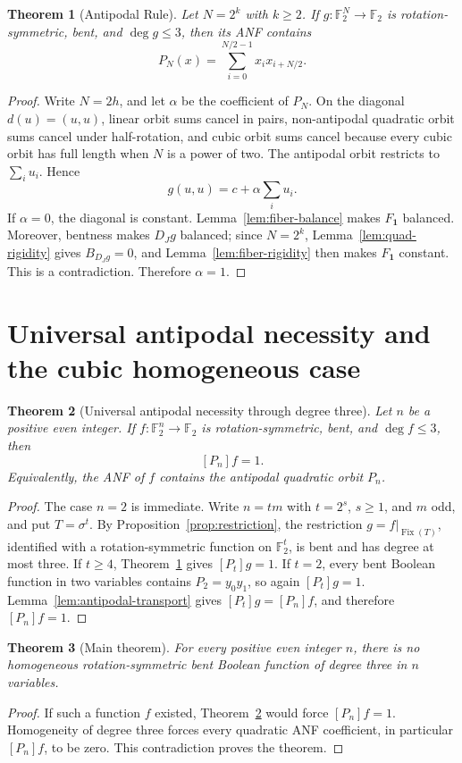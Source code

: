 \documentclass[11pt,a4paper]{article}
\newtheorem{theorem}{Theorem}[section]
\newcommand{\F}{\mathbb F_2}
\newcommand{\Fix}{\operatorname{Fix}}
\begin{document}
\begin{theorem}[Antipodal Rule]\label{thm:antipodal}
Let \(N=2^k\) with \(k\ge2\). If \(g:\F^N\to\F\) is rotation-symmetric, bent, and \(\deg g\le3\), then its ANF contains
\[
P_N(x)=\sum_{i=0}^{N/2-1}x_i x_{i+N/2}.
\]
\end{theorem}
\begin{proof}
Write \(N=2h\), and let \(\alpha\) be the coefficient of \(P_N\). On the diagonal \(d(u)=(u,u)\), linear orbit sums cancel in pairs, non-antipodal quadratic orbit sums cancel under half-rotation, and cubic orbit sums cancel because every cubic orbit has full length when \(N\) is a power of two. The antipodal orbit restricts to \(\sum_i u_i\). Hence
\[
g(u,u)=c+\alpha\sum_i u_i.
\]
If \(\alpha=0\), the diagonal is constant. Lemma~\ref{lem:fiber-balance} makes \(F_{\mathbf1}\) balanced. Moreover, bentness makes \(D_Jg\) balanced; since \(N=2^k\), Lemma~\ref{lem:quad-rigidity} gives \(B_{D_Jg}=0\), and Lemma~\ref{lem:fiber-rigidity} then makes \(F_{\mathbf1}\) constant. This is a contradiction. Therefore \(\alpha=1\).
\end{proof}

\section{Universal antipodal necessity and the cubic homogeneous case}

\begin{theorem}[Universal antipodal necessity through degree three]\label{thm:universal-antipodal}
Let $n$ be a positive even integer. If $f:\F^n\to\F$ is rotation-symmetric, bent, and $\deg f\le3$, then
\[
[P_n]f=1.
\]
Equivalently, the ANF of $f$ contains the antipodal quadratic orbit $P_n$.
\end{theorem}
\begin{proof}
The case $n=2$ is immediate. Write $n=tm$ with $t=2^s$, $s\ge1$, and $m$ odd, and put $T=\sigma^t$. By Proposition~\ref{prop:restriction}, the restriction $g=f|_{\Fix(T)}$, identified with a rotation-symmetric function on $\F^t$, is bent and has degree at most three. If $t\ge4$, Theorem~\ref{thm:antipodal} gives $[P_t]g=1$. If $t=2$, every bent Boolean function in two variables contains $P_2=y_0y_1$, so again $[P_t]g=1$. Lemma~\ref{lem:antipodal-transport} gives $[P_t]g=[P_n]f$, and therefore $[P_n]f=1$.
\end{proof}

\begin{theorem}[Main theorem]\label{thm:global}
For every positive even integer $n$, there is no homogeneous rotation-symmetric bent Boolean function of degree three in $n$ variables.
\end{theorem}
\begin{proof}
If such a function $f$ existed, Theorem~\ref{thm:universal-antipodal} would force $[P_n]f=1$. Homogeneity of degree three forces every quadratic ANF coefficient, in particular $[P_n]f$, to be zero. This contradiction proves the theorem.
\end{proof}
\end{document}
